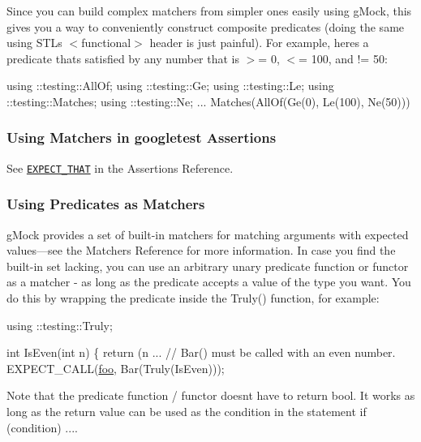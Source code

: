 Since you can build complex matchers from simpler ones easily using g\+Mock, this gives you a way to conveniently construct composite predicates (doing the same using S\+TL\textquotesingle{}s {\ttfamily $<$functional$>$} header is just painful). For example, here\textquotesingle{}s a predicate that\textquotesingle{}s satisfied by any number that is $>$= 0, $<$= 100, and != 50\+:


\begin{DoxyCode}
using ::testing::AllOf;
using ::testing::Ge;
using ::testing::Le;
using ::testing::Matches;
using ::testing::Ne;
...
Matches(AllOf(Ge(0), Le(100), Ne(50)))
\end{DoxyCode}


\subsubsection*{Using Matchers in googletest Assertions}

See \href{reference/assertions.md#EXPECT_THAT}{\tt {\ttfamily E\+X\+P\+E\+C\+T\+\_\+\+T\+H\+AT}} in the Assertions Reference.

\subsubsection*{Using Predicates as Matchers}

g\+Mock provides a set of built-\/in matchers for matching arguments with expected values—see the Matchers Reference for more information. In case you find the built-\/in set lacking, you can use an arbitrary unary predicate function or functor as a matcher -\/ as long as the predicate accepts a value of the type you want. You do this by wrapping the predicate inside the {\ttfamily Truly()} function, for example\+:


\begin{DoxyCode}
using ::testing::Truly;

\textcolor{keywordtype}{int} IsEven(\textcolor{keywordtype}{int} n) \{ \textcolor{keywordflow}{return} (n %
...
  \textcolor{comment}{// Bar() must be called with an even number.}
  EXPECT\_CALL(\mbox{\hyperlink{namespacefoo}{foo}}, Bar(Truly(IsEven)));
\end{DoxyCode}


Note that the predicate function / functor doesn\textquotesingle{}t have to return {\ttfamily bool}. It works as long as the return value can be used as the condition in the statement {\ttfamily if (condition) ...}.

